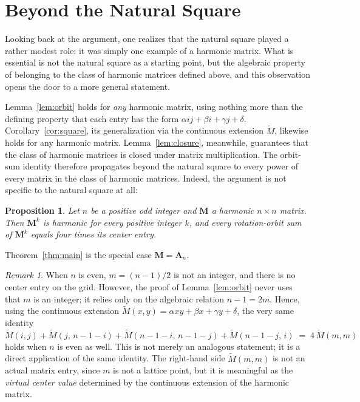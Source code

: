 \documentclass[a4paper,11pt]{article}
\theoremstyle{plain}
\newtheorem{proposition}[theorem]{Proposition}
\theoremstyle{definition}
\theoremstyle{remark}
\newtheorem{remark}[theorem]{Remark}
\newcommand{\A}{\mathbf{A}}
\newcommand{\M}{\mathbf{M}}
\begin{document}
\section{Beyond the Natural Square}

Looking back at the argument, one realizes that the natural square
played a rather modest role: it was simply one example of a harmonic
matrix. What is essential is not the natural square as a starting
point, but the algebraic property of belonging to the class of
harmonic matrices defined above, and this observation opens the door
to a more general statement.



Lemma~\ref{lem:orbit} holds for \emph{any} harmonic matrix, using
nothing more than the defining property that each entry has the form
$\alpha ij+\beta i+\gamma j+\delta$. Corollary~\ref{cor:square}, its
generalization via the continuous extension $\widetilde M$, likewise
holds for any harmonic matrix. Lemma~\ref{lem:closure}, meanwhile,
guarantees that the class of harmonic matrices is closed under matrix
multiplication. The orbit-sum identity therefore propagates beyond
the natural square to every power of every matrix in the class of
harmonic matrices. Indeed, the argument is not specific to the
natural square at all:


\begin{proposition}
Let $n$ be a positive odd integer and $\M$ a harmonic $n\times n$
matrix. Then $\M^k$ is harmonic for every positive integer $k$, and
every rotation-orbit sum of $\M^k$ equals four times its center entry.
\end{proposition}

Theorem~\ref{thm:main} is the special case $\M=\A_n$.

\begin{remark}
\label{rem:even}
When $n$ is even, $m=(n-1)/2$ is not an integer, and there is no
center entry on the grid. However, the proof of Lemma~\ref{lem:orbit}
never uses that $m$ is an integer; it relies only on the algebraic
relation $n-1=2m$. Hence, using the continuous extension
$\widetilde M(x,y)=\alpha xy+\beta x+\gamma y+\delta$, the very same
identity
\[
  \widetilde M(i,j)+\widetilde M(j,\,n{-}1{-}i)
  +\widetilde M(n{-}1{-}i,\,n{-}1{-}j)+\widetilde M(n{-}1{-}j,\,i)
  \;=\;4\,\widetilde M(m,m)
\]
holds when $n$ is even as well. This is not merely an analogous
statement; it is a direct application of the same identity. The
right-hand side $\widetilde M(m,m)$ is not an actual matrix entry,
since $m$ is not a lattice point, but it is meaningful as the
\emph{virtual center value} determined by the continuous extension of
the harmonic matrix.
\end{remark}
\end{document}
